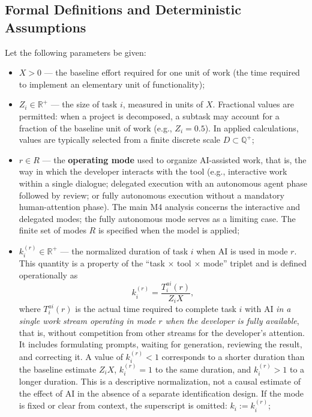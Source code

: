 \subsection{Formal Definitions and Deterministic Assumptions}

\begin{definition}\label{def:params}
Let the following parameters be given:
\begin{itemize}
  \item $X > 0$ --- the baseline effort required for one unit of work (the time required to implement an elementary unit of functionality);
  \item $Z_i \in \mathbb{R}^{+}$ --- the size of task $i$, measured in units of $X$. Fractional values are permitted: when a project is decomposed, a subtask may account for a fraction of the baseline unit of work (e.g., $Z_i = 0.5$). In applied calculations, values are typically selected from a finite discrete scale $D\subset\mathbb{Q}^{+}$;
  \item $r \in R$ --- the \textbf{operating mode} used to organize AI-assisted work, that is, the way in which the developer interacts with the tool (e.g., interactive work within a single dialogue; delegated execution with an autonomous agent phase followed by review; or fully autonomous execution without a mandatory human-attention phase). The main M4 analysis concerns the interactive and delegated modes; the fully autonomous mode serves as a limiting case. The finite set of modes $R$ is specified when the model is applied;
  \item $k_i^{(r)} \in \mathbb{R}^+$ --- the normalized duration of task $i$ when AI is used in mode $r$. This quantity is a property of the ``task $\times$ tool $\times$ mode'' triplet and is defined operationally as
  \[
    k_i^{(r)} = \frac{T_i^{ai}(r)}{Z_i X},
  \]
  where $T_i^{ai}(r)$ is the actual time required to complete task $i$ with AI \emph{in a single work stream operating in mode $r$ when the developer is fully available}, that is, without competition from other streams for the developer's attention. It includes formulating prompts, waiting for generation, reviewing the result, and correcting it. A value of $k_i^{(r)} < 1$ corresponds to a shorter duration than the baseline estimate $Z_iX$, $k_i^{(r)} = 1$ to the same duration, and $k_i^{(r)} > 1$ to a longer duration. This is a descriptive normalization, not a causal estimate of the effect of AI in the absence of a separate identification design. If the mode is fixed or clear from context, the superscript is omitted: $k_i := k_i^{(r)}$;

\end{itemize}
\end{definition}
